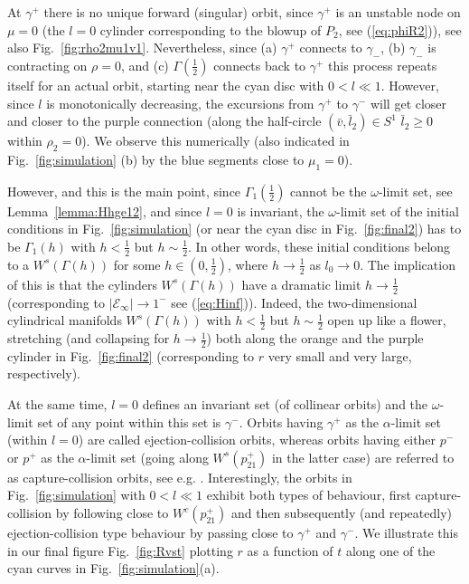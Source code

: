 \documentclass[reqno,12pt]{amsart}
\renewcommand{\eqref}[1]{(\ref{eq:#1})}
\newcommand{\figref}[1]{Fig.~\ref{fig:#1}}
\newcommand{\lemmaref}[1]{Lemma~\ref{lemma:#1}}
\numberwithin{equation}{section}
\begin{document}
At $\gamma^+$ there is no unique forward (singular) orbit, since $\gamma^+$ is an unstable node on $\mu=0$ (the $l=0$ cylinder corresponding to the blowup of $P_2$, see \eqref{phiR2}), see also \figref{rho2mu1v1}. Nevertheless, since (a) $\gamma^+$ connects to $\gamma_-$, (b) $\gamma_-$ is contracting on $\rho=0$, and (c) $\Gamma\!\left(\frac12\right)$ connects back to $\gamma^+$ this process repeats itself for an actual orbit, starting near the cyan disc with $0<l\ll 1$. However, since $l$ is monotonically decreasing, the excursions from $\gamma^+$ to $\gamma^-$ will get closer and closer to the purple connection (along the half-circle $(\bar v,\bar l_2)\in S^1$ $\bar l_2\ge 0$ within $\rho_2=0$). We observe this numerically (also indicated in \figref{simulation} (b) by the blue segments close to $\mu_1=0$). 

 However, and this is the main point, since $\Gamma_1\!\left(\frac12\right)$ cannot be the $\omega$-limit set, see \lemmaref{Hhge12}, and since $l=0$ is invariant, the $\omega$-limit set of the initial conditions in \figref{simulation} (or near the cyan disc in \figref{final2}) has to be $\Gamma_1(h)$ with $h<\frac12$ but $h\sim \frac12$. In other words, these initial conditions belong to a $W^s(\Gamma(h))$ for some $h\in (0,\frac12)$, where $h\rightarrow \frac12$ as $l_0\rightarrow 0$. The implication of this is that the cylinders $W^s(\Gamma(h))$ have a dramatic limit $h\rightarrow \frac12$ (corresponding to $\vert \mathcal E_\infty\vert\rightarrow 1^-$ see \eqref{Hinf}). Indeed, the two-dimensional cylindrical manifolds $W^s(\Gamma(h))$ with $h<\frac12$ but $h\sim \frac12$ open up like a flower, stretching (and collapsing for $h\rightarrow \frac12$) both along the orange and the purple cylinder in \figref{final2} (corresponding to $r$ very small and very large, respectively). 

 At the same time, $l=0$ defines an invariant set (of collinear orbits) and the $\omega$-limit set of any point within this set is $\gamma^-$. Orbits having $\gamma^+$ as the $\alpha$-limit set (within $l=0$) are called ejection-collision orbits, whereas orbits having either $p^-$ or $p^+$ as the $\alpha$-limit set (going along $W^s(p_{21}^+)$ in the latter case) are referred to as capture-collision orbits, see e.g. \cite{diacu1999a,margheri2014a}. Interestingly, the orbits in \figref{simulation} with $0<l\ll 1$ exhibit both types of behaviour, first capture-collision by following close to $W^c(p_{21}^+)$ and then subsequently (and repeatedly) ejection-collision type behaviour by passing close to $\gamma^+$ and $\gamma^-$. We illustrate this in our final figure \figref{Rvst} plotting $r$ as a function of $t$ along one of the cyan curves in \figref{simulation}(a). 
 
\end{document}

